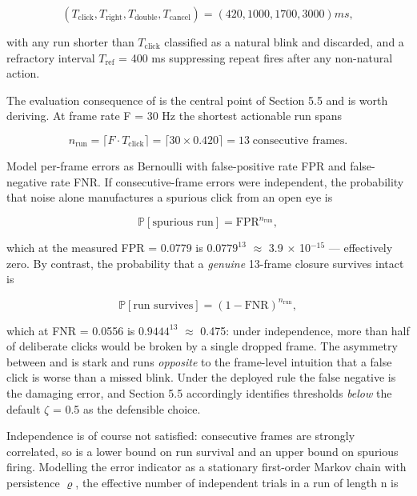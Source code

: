 \begin{equation}
\label{eq:119}
(T_{\mathrm{click}}, T_{\mathrm{right}}, T_{\mathrm{double}}, T_{\mathrm{cancel}}) = (420, 1000, 1700, 3000) ms,
\end{equation}

with any run shorter than $T_{\mathrm{click}}$ classified as a natural blink and discarded, and a refractory interval $T_{\mathrm{ref}}$ = 400 ms suppressing repeat fires after any non-natural action.

The evaluation consequence of  is the central point of Section 5.5 and is worth deriving. At frame rate F = 30 Hz the shortest actionable run spans

\begin{equation}
\label{eq:120}
n_{\mathrm{run}} = \lceil F \cdot T_{\mathrm{click}} \rceil = \lceil 30 \times 0.420 \rceil = 13 \;\text{consecutive frames}.
\end{equation}

Model per-frame errors as Bernoulli with false-positive rate FPR and false-negative rate FNR. If consecutive-frame errors were independent, the probability that noise alone manufactures a spurious click from an open eye is

\begin{equation}
\label{eq:121}
\mathbb{P}[ \text{spurious run} ] = \mathrm{FPR}^{n_{\mathrm{run}}},
\end{equation}

which at the measured FPR = 0.0779 is $0.0779^{13}$ $\approx$ 3.9 $\times$ 10$^{-15}$ --- effectively zero. By contrast, the probability that a \emph{genuine} 13-frame closure survives intact is

\begin{equation}
\label{eq:122}
\mathbb{P}[ \text{run survives} ] = ( 1 - \mathrm{FNR} )^{n_{\mathrm{run}}},
\end{equation}

which at FNR = 0.0556 is $0.9444^{13}$ $\approx$ 0.475: under independence, more than half of deliberate clicks would be broken by a single dropped frame. The asymmetry between  and  is stark and runs \emph{opposite} to the frame-level intuition that a false click is worse than a missed blink. Under the deployed rule the false negative is the damaging error, and Section 5.5 accordingly identifies thresholds \emph{below} the default $\zeta$ = 0.5 as the defensible choice.

Independence is of course not satisfied: consecutive frames are strongly correlated, so  is a lower bound on run survival and  an upper bound on spurious firing. Modelling the error indicator as a stationary first-order Markov chain with persistence $\varrho$, the effective number of independent trials in a run of length n is

